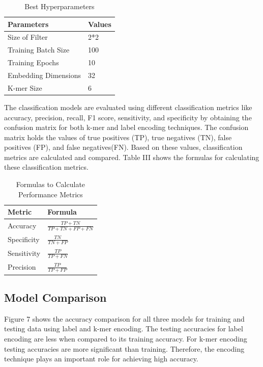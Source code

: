 \documentclass[journal]{IEEEtran}
\begin{document}
\begin{table}
  \caption{\label{tab:table2}Best Hyperparameters}
  \centering
    \begin{tabular}{ || l l ||}
    \hline
    Parameters & Values \\ 
    \hline
    \hline
    Size of Filter       & 2*2 \\  
    Training Batch Size  & 100 \\
    Training Epochs      & 10  \\
    Embedding Dimensions & 32  \\
    K-mer Size           & 6   \\
    \hline
    \end{tabular}%
\end{table}

The classification models are evaluated using different classification metrics like accuracy, precision, recall, F1 score, sensitivity, 
and specificity by obtaining the confusion matrix for both k-mer and label encoding techniques.
The confusion matrix holds the values of true positives (TP), true negatives (TN), false positives (FP), and false negatives(FN). 
Based on these values, classification metrics are calculated and compared.
Table III shows the formulas for calculating these classification metrics. 
\begin{table}
  \caption{\label{tab:table3}Formulas to Calculate Performance Metrics}
  \centering
    \begin{tabular}{ || l l ||}
    \hline
    Metric & Formula \\ 
    \hline
    \hline
    Accuracy    & $\frac{TP + TN}{TP + TN + FP + FN}$\\  
    Specificity & $\frac{TN}{TN + FP}$ \\
    Sensitivity & $\frac{TP}{TP + FN}$ \\
    Precision   & $\frac{TP}{TP + FP}$ \\
    \hline
    \end{tabular}%
\end{table}

\subsection{Model Comparison}
Figure 7 shows the accuracy comparison for all three models for training and testing data using label and k-mer encoding. 
The testing accuracies for label encoding are less when compared to its training accuracy. 
For k-mer encoding testing accuracies are more significant than training. 
Therefore, the encoding technique plays an important role for achieving high accuracy.
 
\end{document}
